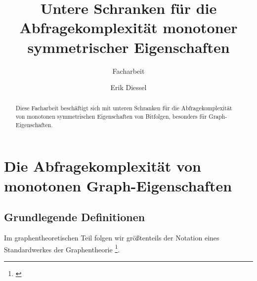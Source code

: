 \documentclass[a4paper]{scrreprt}
\title{Untere Schranken für die Abfragekomplexität 
       monotoner symmetrischer Eigenschaften}
\subtitle{Facharbeit}
\author{Erik Diessel}
\begin{document}
\maketitle

\begin{abstract}
Diese Facharbeit beschäftigt sich mit unteren Schranken
für die Abfragekomplexität von monotonen symmetrischen
Eigenschaften von Bitfolgen, besonders für Graph-Eigenschaften.
\end{abstract}

\tableofcontents

\chapter{Die Abfragekomplexität von monotonen Graph-Eigenschaften}
\section{Grundlegende Definitionen}
Im graphentheoretischen Teil folgen wir größtenteils
der Notation eines Standardwerkes der Graphentheorie \footnote{\cite{diestel}}.


\printbibliography
\end{document}
